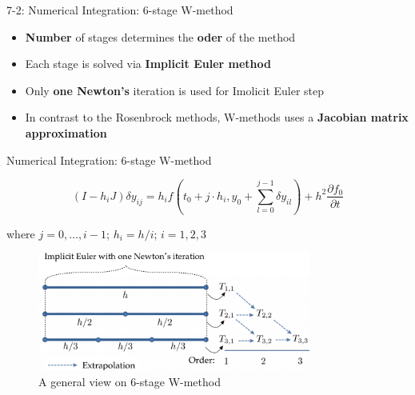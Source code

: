 \begin{frame}[t]{7-2: Numerical Integration: 6-stage W-method}

    \justifying
  

        \begin{itemize}
            \setlength\itemsep{0.5cm}
            \item \textbf{Number} of stages determines the \textbf{oder} of the method
            \item Each stage is solved via \textbf{Implicit Euler method}
            \item Only \textbf{one Newton's} iteration is used for Imolicit Euler step 
            \item In contrast to the Rosenbrock methods, W-methods uses a \textbf{Jacobian matrix approximation}
        \end{itemize}

    \normalsize
\end{frame}

\fi


\ifPresentation
\begin{frame}[t]{Numerical Integration: 6-stage W-method}
    \justifying
    
    \begin{equation}
        (I - h_{i}J)\delta y_{ij} = h_{i} f(t_{0} + j \cdot h_{i}, y_{0} + \sum^{j-1}_{l = 0} \delta y_{il}) + h^{2} \frac{\partial f_{0}}{\partial t}
    \end{equation}
    
    where $j=0, \dots, i - 1$; $h_{i} = h / i$; $i = 1, 2, 3$

    \begin{figure}[htpb]
          \centering
          \includegraphics[width=0.8\textwidth]{figures/introduction-rosenbrock-scheme.png}
        \caption{A general view on 6-stage W-method \cite{tims-presentation}}
        \label{fig:introduction-w-method-scheme}
    \end{figure}

\end{frame}

\fi
